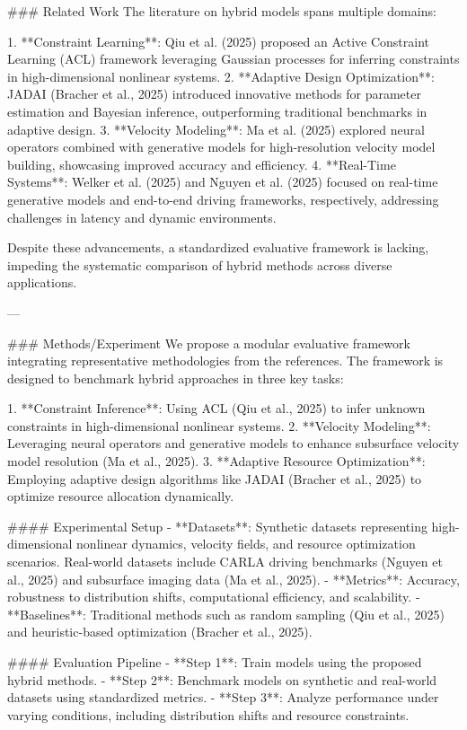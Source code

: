 ### Related Work  
The literature on hybrid models spans multiple domains:  

1. **Constraint Learning**: Qiu et al. (2025) proposed an Active Constraint Learning (ACL) framework leveraging Gaussian processes for inferring constraints in high-dimensional nonlinear systems.  
2. **Adaptive Design Optimization**: JADAI (Bracher et al., 2025) introduced innovative methods for parameter estimation and Bayesian inference, outperforming traditional benchmarks in adaptive design.  
3. **Velocity Modeling**: Ma et al. (2025) explored neural operators combined with generative models for high-resolution velocity model building, showcasing improved accuracy and efficiency.  
4. **Real-Time Systems**: Welker et al. (2025) and Nguyen et al. (2025) focused on real-time generative models and end-to-end driving frameworks, respectively, addressing challenges in latency and dynamic environments.  

Despite these advancements, a standardized evaluative framework is lacking, impeding the systematic comparison of hybrid methods across diverse applications.  

---

### Methods/Experiment  
We propose a modular evaluative framework integrating representative methodologies from the references. The framework is designed to benchmark hybrid approaches in three key tasks:  

1. **Constraint Inference**: Using ACL (Qiu et al., 2025) to infer unknown constraints in high-dimensional nonlinear systems.  
2. **Velocity Modeling**: Leveraging neural operators and generative models to enhance subsurface velocity model resolution (Ma et al., 2025).  
3. **Adaptive Resource Optimization**: Employing adaptive design algorithms like JADAI (Bracher et al., 2025) to optimize resource allocation dynamically.  

#### Experimental Setup  
- **Datasets**: Synthetic datasets representing high-dimensional nonlinear dynamics, velocity fields, and resource optimization scenarios. Real-world datasets include CARLA driving benchmarks (Nguyen et al., 2025) and subsurface imaging data (Ma et al., 2025).  
- **Metrics**: Accuracy, robustness to distribution shifts, computational efficiency, and scalability.  
- **Baselines**: Traditional methods such as random sampling (Qiu et al., 2025) and heuristic-based optimization (Bracher et al., 2025).  

#### Evaluation Pipeline  
- **Step 1**: Train models using the proposed hybrid methods.  
- **Step 2**: Benchmark models on synthetic and real-world datasets using standardized metrics.  
- **Step 3**: Analyze performance under varying conditions, including distribution shifts and resource constraints.  

